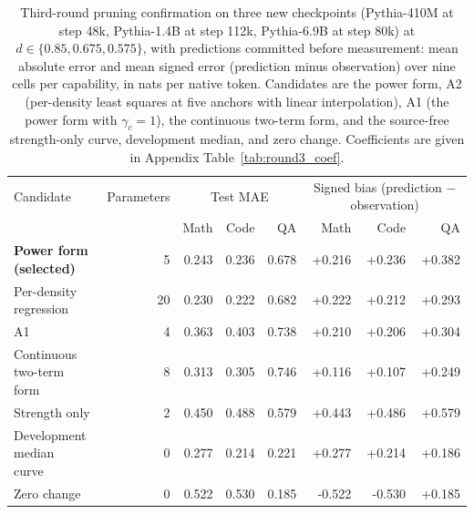 \begin{table}[!htbp]\normalfont\centering\footnotesize\setlength{\tabcolsep}{3pt}
\begin{tabular*}{\textwidth}{@{\extracolsep{\fill}}lrrrrrrr@{}}
\toprule
Candidate & Parameters & \multicolumn{3}{c}{Test MAE} & \multicolumn{3}{c}{Signed bias (prediction $-$ observation)} \\
\cmidrule(lr){3-5}\cmidrule(lr){6-8}
 & & Math & Code & QA & Math & Code & QA \\
\midrule
\textbf{Power form (selected)} & 5 & 0.243 & 0.236 & 0.678 & +0.216 & +0.236 & +0.382 \\
\shortstack[l]{Per-density\\regression} & 20 & 0.230 & 0.222 & 0.682 & +0.222 & +0.212 & +0.293 \\
A1 & 4 & 0.363 & 0.403 & 0.738 & +0.210 & +0.206 & +0.304 \\
\shortstack[l]{Continuous two-term\\form} & 8 & 0.313 & 0.305 & 0.746 & +0.116 & +0.107 & +0.249 \\
Strength only & 2 & 0.450 & 0.488 & 0.579 & +0.443 & +0.486 & +0.579 \\
\shortstack[l]{Development median\\curve} & 0 & 0.277 & 0.214 & 0.221 & +0.277 & +0.214 & +0.186 \\
Zero change & 0 & 0.522 & 0.530 & 0.185 & -0.522 & -0.530 & +0.185 \\
\bottomrule\end{tabular*}
\caption{Third-round pruning confirmation on three new checkpoints (Pythia-410M at step 48k, Pythia-1.4B at step 112k, Pythia-6.9B at step 80k) at $d\in\{0.85,0.675,0.575\}$, with predictions committed before measurement: mean absolute error and mean signed error (prediction minus observation) over nine cells per capability, in nats per native token. Candidates are the power form, A2 (per-density least squares at five anchors with linear interpolation), A1 (the power form with $\gamma_c{=}1$), the continuous two-term form, and the source-free strength-only curve, development median, and zero change. Coefficients are given in Appendix Table~\ref{tab:round3_coef}.}
\label{tab:round3_prune}\end{table}

